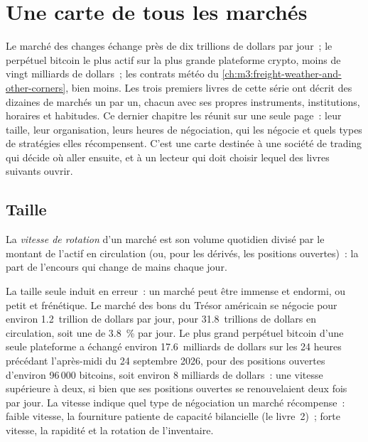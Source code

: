 \chapter{Une carte de tous les marchés}\label{ch:m3:a-map-of-all-markets}

Le marché des changes échange près de dix trillions de dollars par jour~; le perpétuel bitcoin le plus actif sur
la plus grande plateforme crypto, moins de vingt milliards de dollars~; les contrats météo du \cref{ch:m3:freight-weather-and-other-corners}, bien moins. Les trois premiers
livres de cette série ont décrit des dizaines de marchés un par un, chacun avec ses propres instruments,
institutions, horaires et habitudes. Ce dernier chapitre les réunit sur une seule page~: leur taille, leur
organisation, leurs heures de négociation, qui les négocie et quels types de stratégies elles récompensent. C'est une carte destinée à une
société de trading qui décide où aller ensuite, et à un lecteur qui doit choisir lequel des livres suivants ouvrir.

\section{Taille}

\begin{definition}\label{def:m3:a-map-of-all-markets:velocity}
La \emph{vitesse de rotation} d'un marché est son volume quotidien divisé par le montant de l'actif
en circulation (ou, pour les dérivés, les positions ouvertes)~: la part de l'encours qui change de mains chaque jour.
\end{definition}

La taille seule induit en erreur~: un marché peut être immense et endormi, ou petit et frénétique. Le marché des bons du Trésor américain se négocie pour environ 1.2~trillion de dollars
par jour, pour 31.8~trillions de dollars en circulation, soit une  de 3.8~\% par jour. Le plus grand perpétuel bitcoin d'une seule plateforme a échangé environ
17.6~milliards de dollars sur les 24 heures précédant l'après-midi du 24 septembre 2026, pour des positions ouvertes d'environ 96\,000 bitcoins, soit environ 8
milliards de dollars~: une vitesse supérieure à deux, si bien que ses positions ouvertes se renouvelaient deux fois par jour. La vitesse indique quel type de négociation un marché récompense~:
faible vitesse, la fourniture patiente de capacité bilancielle (le livre~2)~; forte vitesse, la rapidité et la rotation de l'inventaire.

